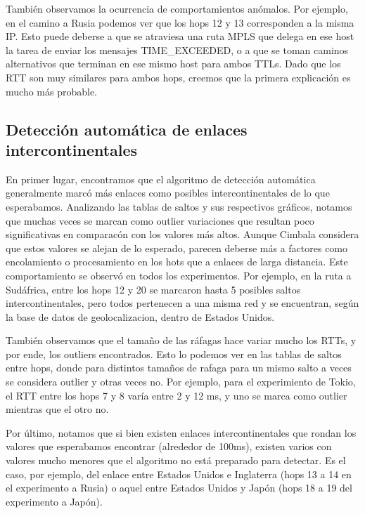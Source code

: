 También observamos la ocurrencia de comportamientos anómalos. Por ejemplo, en el camino a Rusia podemos ver que los hops 12 y 13 corresponden a la misma IP. Esto puede deberse a que se atraviesa una ruta MPLS que delega en ese host la tarea de enviar los mensajes TIME\_EXCEEDED, o a que se toman caminos alternativos  que terminan en ese mismo host para ambos TTLs. Dado que los RTT son muy similares para ambos hops, creemos que la primera explicación es mucho más probable.


\subsection{Detección automática de enlaces intercontinentales}

En primer lugar, encontramos que el algoritmo de detección automática generalmente marcó más enlaces como posibles intercontinentales de lo que esperabamos.
Analizando las tablas de saltos y sus respectivos gráficos, 
notamos que muchas veces se marcan como outlier variaciones que resultan poco significativas en comparacón con los valores más altos. Aunque Cimbala considera que estos valores se alejan de lo esperado, parecen deberse más a factores como encolamiento o procesamiento en los hots que a enlaces de larga distancia. 
Este comportamiento se observó en todos los experimentos. 
Por ejemplo, en la ruta a Sudáfrica, entre los hops 12 y 20 se marcaron hasta 5 posibles saltos intercontinentales,
pero todos pertenecen a una misma red y se encuentran, según la base de datos de geolocalizacion, dentro de Estados Unidos.


También observamos que el tamaño de las ráfagas hace variar mucho los RTTs, y por ende, los outliers encontrados. 
Esto lo podemos ver en las tablas de saltos entre hops, donde para distintos tamaños de rafaga para un mismo salto a veces se considera outlier y otras veces no. Por ejemplo, para el experimiento de Tokio, el RTT entre los hops 7 y 8 varía entre 2 y 12 ms, y uno se marca como outlier mientras que el otro no.

Por último, notamos que si bien existen enlaces intercontinentales que rondan los valores que esperabamos encontrar (alrededor de 100ms), existen varios con valores mucho menores que el algoritmo no está preparado para detectar. Es el caso, por ejemplo, del enlace entre Estados Unidos e Inglaterra (hops 13 a 14 en el experimento a Rusia) o aquel entre Estados Unidos y Japón (hops 18 a 19 del experimento a Japón).




